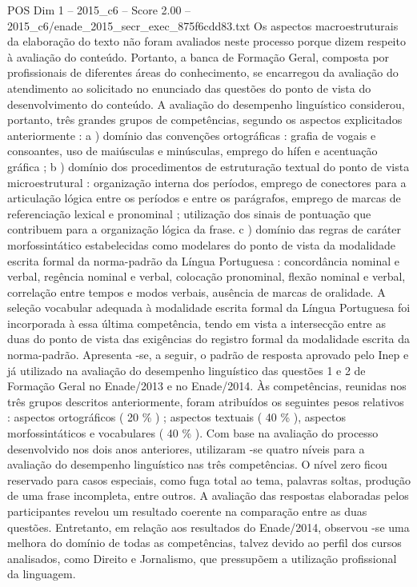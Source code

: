 \begin{textsample}{POS Dim 1 – 2015\_c6 – Score 2.00 – 2015\_c6/enade\_2015\_secr\_exec\_875f6cdd83.txt}
Os aspectos macroestruturais da elaboração do texto não foram avaliados neste processo porque dizem respeito à avaliação do conteúdo.
Portanto, a banca de Formação Geral, composta por profissionais de diferentes áreas do conhecimento, se encarregou da avaliação do atendimento ao solicitado no enunciado das questões do ponto de vista do desenvolvimento do conteúdo.
A avaliação do desempenho linguístico considerou, portanto, três grandes grupos de competências, segundo os aspectos explicitados anteriormente : a ) domínio das convenções ortográficas : grafia de vogais e consoantes, uso de maiúsculas e minúsculas, emprego do hífen e acentuação gráfica ; b ) domínio dos procedimentos de estruturação textual do ponto de vista microestrutural : organização interna dos períodos, emprego de conectores para a articulação lógica entre os períodos e entre os parágrafos, emprego de marcas de referenciação lexical e pronominal ; utilização dos sinais de pontuação que contribuem para a organização lógica da frase. c ) domínio das regras de caráter morfossintático estabelecidas como modelares do ponto de vista da modalidade escrita formal da norma-padrão da Língua Portuguesa : concordância nominal e verbal, regência nominal e verbal, colocação pronominal, flexão nominal e verbal, correlação entre tempos e modos verbais, ausência de marcas de oralidade.
A seleção vocabular adequada à modalidade escrita formal da Língua Portuguesa foi incorporada à essa última competência, tendo em vista a intersecção entre as duas do ponto de vista das exigências do registro formal da modalidade escrita da norma-padrão.
Apresenta -se, a seguir, o padrão de resposta aprovado pelo Inep e já utilizado na avaliação do desempenho linguístico das questões 1 e 2 de Formação Geral no Enade/2013 e no Enade/2014.
Às competências, reunidas nos três grupos descritos anteriormente, foram atribuídos os seguintes pesos relativos : aspectos ortográficos ( 20 \% ) ; aspectos textuais ( 40 \% ), aspectos morfossintáticos e vocabulares ( 40 \% ).
Com base na avaliação do processo desenvolvido nos dois anos anteriores, utilizaram -se quatro níveis para a avaliação do desempenho linguístico nas três competências.
O nível zero ficou reservado para casos especiais, como fuga total ao tema, palavras soltas, produção de uma frase incompleta, entre outros.
A avaliação das respostas elaboradas pelos participantes revelou um resultado coerente na comparação entre as duas questões.
Entretanto, em relação aos resultados do Enade/2014, observou -se uma melhora do domínio de todas as competências, talvez devido ao perfil dos cursos analisados, como Direito e Jornalismo, que pressupõem a utilização profissional da linguagem.

\end{textsample}
